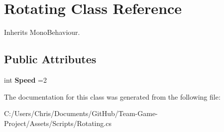\hypertarget{class_rotating}{}\section{Rotating Class Reference}
\label{class_rotating}


Inherits Mono\+Behaviour.

\subsection*{Public Attributes}
\begin{DoxyCompactItemize}
\item 
int {\bfseries Speed} =2\hypertarget{class_rotating_a6457c77fff2d0c1cc6441dd63579345c}{}\label{class_rotating_a6457c77fff2d0c1cc6441dd63579345c}

\end{DoxyCompactItemize}


The documentation for this class was generated from the following file\+:\begin{DoxyCompactItemize}
\item 
C\+:/\+Users/\+Chris/\+Documents/\+Git\+Hub/\+Team-\/\+Game-\/\+Project/\+Assets/\+Scripts/Rotating.\+cs\end{DoxyCompactItemize}
